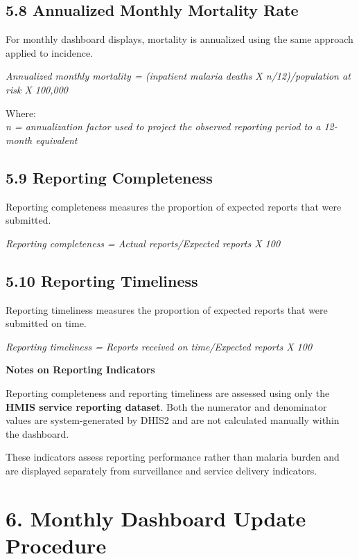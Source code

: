 \documentclass[
  letterpaper,
  DIV=11,
  numbers=noendperiod]{scrartcl}
\begin{document}
\subsection{5.8 Annualized Monthly Mortality
Rate}\label{annualized-monthly-mortality-rate}

For monthly dashboard displays, mortality is annualized using the same
approach applied to incidence.

\emph{Annualized monthly mortality = (inpatient malaria deaths X
n/12)/population at risk X 100,000}

Where:\\
\emph{n = annualization factor used to project the observed reporting
period to a 12-month equivalent}

\subsection{5.9 Reporting Completeness}\label{reporting-completeness}

Reporting completeness measures the proportion of expected reports that
were submitted.

\emph{Reporting completeness = Actual reports/Expected reports X 100}

\subsection{5.10 Reporting Timeliness}\label{reporting-timeliness}

Reporting timeliness measures the proportion of expected reports that
were submitted on time.

\emph{Reporting timeliness = Reports received on time/Expected reports X
100}

\textbf{Notes on Reporting Indicators}

Reporting completeness and reporting timeliness are assessed using only
the \textbf{HMIS service reporting dataset}. Both the numerator and
denominator values are system-generated by DHIS2 and are not calculated
manually within the dashboard.

These indicators assess reporting performance rather than malaria burden
and are displayed separately from surveillance and service delivery
indicators.

\section{6. Monthly Dashboard Update
Procedure}\label{monthly-dashboard-update-procedure}
\end{document}
